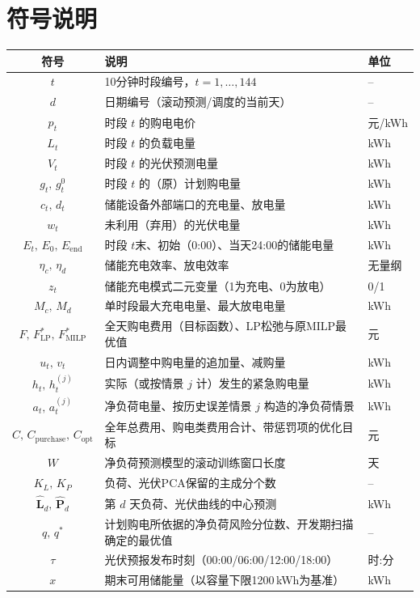 \section{符号说明}
\begin{table}[H]
  \centering
  \label{tab:notation}
  \footnotesize
  \renewcommand{\arraystretch}{1.05}
  \begin{tabular}{cll}
    \toprule
    符号 & 说明 & 单位 \\
    \midrule
    $t$ & 10分钟时段编号，$t=1,\ldots,144$ & -- \\
    $d$ & 日期编号（滚动预测/调度的当前天） & -- \\
    $p_t$ & 时段 $t$ 的购电电价 & 元/kWh \\
    $L_t$ & 时段 $t$ 的负载电量 & kWh \\
    $V_t$ & 时段 $t$ 的光伏预测电量 & kWh \\
    $g_t,\,g_t^0$ & 时段 $t$ 的（原）计划购电量 & kWh \\
    $c_t,\,d_t$ & 储能设备外部端口的充电量、放电量 & kWh \\
    $w_t$ & 未利用（弃用）的光伏电量 & kWh \\
    $E_t,\,E_0,\,E_{\mathrm{end}}$ & 时段 $t$末、初始（0:00）、当天24:00的储能电量 & kWh \\
    $\eta_c,\,\eta_d$ & 储能充电效率、放电效率 & 无量纲 \\
    $z_t$ & 储能充电模式二元变量（1为充电、0为放电） & 0/1 \\
    $M_c,\,M_d$ & 单时段最大充电电量、最大放电电量 & kWh \\
    $F,\,F_{\mathrm{LP}}^\ast,\,F_{\mathrm{MILP}}^\ast$ & 全天购电费用（目标函数）、LP松弛与原MILP最优值 & 元 \\
    $u_t,\,v_t$ & 日内调整中购电量的追加量、减购量 & kWh \\
    $h_t,\,h_t^{(j)}$ & 实际（或按情景 $j$ 计）发生的紧急购电量 & kWh \\
    $a_t,\,a_t^{(j)}$ & 净负荷电量、按历史误差情景 $j$ 构造的净负荷情景 & kWh \\
    $C,\,C_{\mathrm{purchase}},\,C_{\mathrm{opt}}$ & 全年总费用、购电类费用合计、带惩罚项的优化目标 & 元 \\
    $W$ & 净负荷预测模型的滚动训练窗口长度 & 天 \\
    $K_L,\,K_P$ & 负荷、光伏PCA保留的主成分个数 & -- \\
    $\widehat{\bm L}_d,\,\widehat{\bm P}_d$ & 第 $d$ 天负荷、光伏曲线的中心预测 & kWh \\
    $q,\,q^\ast$ & 计划购电所依据的净负荷风险分位数、开发期扫描确定的最优值 & -- \\
    $\tau$ & 光伏预报发布时刻（00:00/06:00/12:00/18:00） & 时:分 \\
    $x$ & 期末可用储能量（以容量下限1200\,kWh为基准） & kWh \\
    \bottomrule
  \end{tabular}
\end{table}
